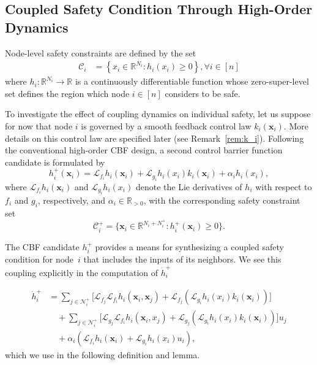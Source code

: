 \documentclass[letterpaper, 10 pt, conference]{ieeeconf}  %
\theoremstyle{plain}
\begin{document}
\subsection{Coupled Safety Condition Through High-Order Dynamics} \label{sec:1D_example}
Node-level safety constraints are defined by the set
\begin{equation}\label{eq:safe_set_i_fullstate}
    \begin{aligned}
        \mathcal{C}_i &= \left\{ x_i \in \mathbb{R}^{N_i} : h_i(x_i) \geq 0 \right\}, \forall i \in [n]
    \end{aligned}
\end{equation}
where $h_i:\mathbb{R}^{N_i} \rightarrow \mathbb{R}$ is a continuously differentiable function whose zero-super-level set defines the region which node $i\in [n]$ considers to be safe.

To investigate the effect of coupling dynamics  on individual safety,  let us suppose for now that node $i$ is governed by a smooth feedback control law $k_i(\mathbf{x}_i)$. More details on this control law are specified later (see Remark~\ref{rem:k_i}). Following the conventional high-order CBF design\cite{tan2021high}, a second control barrier function candidate is formulated by  
\begin{equation} \label{eq:h_i+}
    h_i^+(\mathbf{x}_i) = \mathcal{L}_{f_i}h_i(\mathbf{x}_i) + \mathcal{L}_{g_i}h_i(x_i)k_i(\mathbf{x}_i) + \alpha_i h_i(x_i),
\end{equation}
where $\mathcal{L}_{f_i}h_i(\mathbf{x}_i)$ and $\mathcal{L}_{g_i}h_i(x_i)$ denote the Lie derivatives of $h_i$ with respect to $f_i$ and $g_i$, respectively, and $\alpha_i \in \mathbb{R}_{>0}$, with the corresponding safety constraint set
\begin{equation}\label{eq:C_i+}
    \mathcal{C}_i^+ = \{ \mathbf{x}_i \in \mathbb{R}^{N_i + N_i^+}: h_i^+(\mathbf{x}_i) \geq 0 \}.
\end{equation}

The CBF candidate $h_i^+$ provides a means for synthesizing a coupled safety condition for node~$i$ that includes the inputs of its neighbors. We see this coupling explicitly in the computation of $\dot{h}_i^+$

\vspace{-2ex}
\footnotesize
\begin{align}
   \dot{h}_i^+ &= \sum_{j \in \mathcal{N}_i^+} \big[ \mathcal{L}_{f_j} \mathcal{L}_{f_i}  h_i(\mathbf{x}_i, \mathbf{x}_j) +  \mathcal{L}_{f_j} \left(\mathcal{L}_{g_i}  h_i(x_i) k_i(\mathbf{x}_i)\right) \big] \nonumber \\
    &
   \quad 
   +\sum_{j \in \mathcal{N}_i^+} \big[ \mathcal{L}_{g_j} \mathcal{L}_{f_i}  h_i(\mathbf{x}_i, x_j) +  \mathcal{L}_{g_j} \left( \mathcal{L}_{g_i}  h_i(x_i) k_i(\mathbf{x}_i) \right) \big] u_j \nonumber \\
    &
    \quad 
    + \alpha_i \left( \mathcal{L}_{f_i}  h_i(\mathbf{x}_i) + \mathcal{L}_{g_i}h_i(x_i) u_i \right), \label{eq:sec_der_h_i_control_aff}
\end{align}
\normalsize
which we use in the following definition and lemma.
\end{document}
